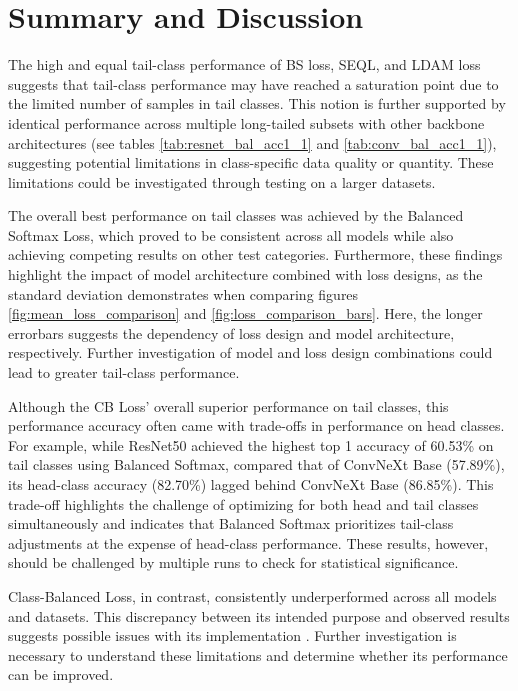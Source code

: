 \section{Summary and Discussion}
The high and equal tail-class performance of BS loss, SEQL, and LDAM loss suggests that tail-class performance may have reached a saturation point due to the limited number of samples in tail classes. This notion is further supported by identical performance across multiple long-tailed subsets with other backbone architectures (see tables \ref{tab:resnet_bal_acc1_1} and \ref{tab:conv_bal_acc1_1}), suggesting potential limitations in class-specific data quality or quantity. These limitations could be investigated through testing on a larger datasets. 

The overall best performance on tail classes was achieved by the Balanced Softmax Loss, which proved to be consistent across all models while also achieving competing results on other test categories. Furthermore, these findings highlight the impact of model architecture combined with loss designs, as the standard deviation demonstrates when comparing figures \ref{fig:mean_loss_comparison} and \ref{fig:loss_comparison_bars}. Here, the longer errorbars suggests the dependency of loss design and model architecture, respectively. Further investigation of model and loss design combinations could lead to greater tail-class performance.

Although the CB Loss' overall superior performance on tail classes, this performance accuracy often came with trade-offs in performance on head classes. For example, while ResNet50 achieved the highest top 1 accuracy of 60.53\% on tail classes using Balanced Softmax, compared that of ConvNeXt Base (57.89\%), its head-class accuracy (82.70\%) lagged behind ConvNeXt Base (86.85\%). This trade-off highlights the challenge of optimizing for both head and tail classes simultaneously and indicates that Balanced Softmax prioritizes tail-class adjustments at the expense of head-class performance. These results, however, should be challenged by multiple runs to check for statistical significance.

Class-Balanced Loss, in contrast, consistently underperformed across all models and datasets. This discrepancy between its intended purpose and observed results suggests possible issues with its implementation . Further investigation is necessary to understand these limitations and determine whether its performance can be improved. 

